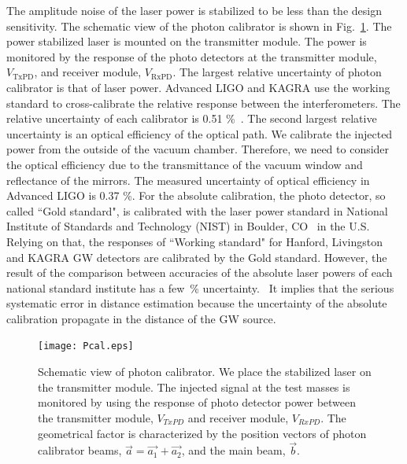 \documentclass[A4]{spie}  %
\begin{document}
The amplitude noise of the laser power is stabilized to be less than the design sensitivity. The schematic view of the photon calibrator is shown in Fig.~\ref{fig:Pcal}. The power stabilized laser is mounted on the transmitter module. The power is monitored by the response of the photo detectors at the transmitter module, $V_{\mathrm{TxPD}}$, and receiver module, $V_{\mathrm{RxPD}}$.  
The largest relative %
uncertainty of photon calibrator is that of laser power.
Advanced LIGO and KAGRA use the working standard to cross-calibrate the relative response between the interferometers. The relative uncertainty of each calibrator is 0.51 \%~\cite{doi:10.1063/1.4967303}. 
The second largest relative uncertainty is an optical efficiency of the optical path. We calibrate the injected power from the outside of the vacuum chamber. Therefore, we need to consider the optical efficiency due to the transmittance of the vacuum window and reflectance of the mirrors. The measured uncertainty of optical efficiency in Advanced LIGO is 0.37 \%. 
For the absolute calibration, the photo detector, so called ``Gold standard", is calibrated with the laser power standard in National Institute of Standards and Technology (NIST) in Boulder, CO~\cite{taylor:1994:GEEU} in the U.S. 
Relying on that, the responses of ``Working standard" for Hanford, Livingston and KAGRA GW detectors are calibrated by the Gold standard. 
However, the result of the comparison between accuracies of the absolute laser powers of each national standard institute has a few~\% 
uncertainty.~\cite{EUROMET} %
 It implies that the serious systematic error in distance estimation because the uncertainty of the absolute calibration propagate in the distance of the GW source.

\begin{figure}
\begin{center}
\texttt{[image: Pcal.eps]}
\caption{Schematic view of photon calibrator. We place the stabilized laser on the transmitter module. The injected signal at the test masses is monitored by using the response of photo detector power between the transmitter module, $V_{TxPD}$ and  receiver module, $V_{RxPD}$.  The geometrical factor is characterized by the position vectors of photon calibrator beams, $\vec{a}=\vec{a_1}+\vec{a_2}$, and the main beam, $\vec{b}$.}
\label{fig:Pcal}
\end{center}
\end{figure}
\end{document}
